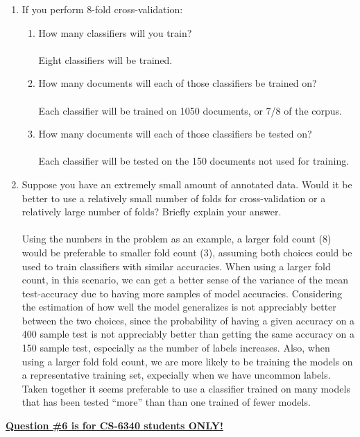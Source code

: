 \documentclass[11pt]{article}
\begin{document}
\begin{enumerate}
\begin{enumerate}
\item If you perform 8-fold cross-validation:
\begin{enumerate}
\item How many classifiers will you train?\\ ~ \\
Eight classifiers will be trained.\\
\item How many documents will each of those classifiers be trained on? \\ ~ \\
Each classifier will be trained on 1050 documents, or 7/8 of the corpus.\\
\item How many documents will each of those classifiers be tested on?\\ ~ \\
Each classifier will be tested on the 150 documents not used for training.\\
\end{enumerate}

\item Suppose you have an extremely small amount of annotated data. 
  Would it be better to use a relatively small number of folds for
  cross-validation or a relatively large number of folds? Briefly explain your
  answer.\\ ~ \\ 
Using the numbers in the problem as an example, a larger fold count
(8) would be preferable to smaller fold count (3), assuming both
choices could be used to train classifiers with similar
accuracies. When using a larger fold count, in this scenario, we can
get a better sense of the variance of the mean test-accuracy due to
having more samples of model accuracies.  Considering the estimation
of how well the model generalizes is not appreciably better between
the two choices, since the probability of having a given accuracy on a
400 sample test is not appreciably better than getting the same
accuracy on a 150 sample test, especially as the number of labels
increases. Also, when using a larger fold fold count, we are more
likely to be training the models on a representative training set,
expecially when we have uncommon labels. Taken together it seems
preferable to use a classifier trained on many models that has been
tested ``more'' than than one trained of fewer models.

\end{enumerate}


\newpage
\underline{\textbf{Question \#6 is for CS-6340 students ONLY!}}  \\


\end{enumerate}
\end{document}
